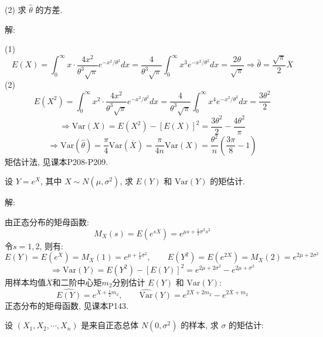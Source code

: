 \documentclass[standard]{ExBook}
\renewenvironment{shaded}{%
  \def\FrameCommand{\fboxsep=\FrameSep \colorbox{shadecolor}}%
  \MakeFramed{\advance\hsize-\width \FrameRestore}%
}{%
  \endMakeFramed
}
\begin{document}
\begin{qitems}
\begin{bbox}
\begin{shaded}
(2) 求 \(\hat{\theta}\) 的方差.
    \end{shaded}
    \end{bbox}

\vspace{\dimexpr2.5cm-5em\relax}

解:

(1)
$$
E(X)=\int_{0}^{\infty}x\cdot\frac{4x^2}{\theta^3\sqrt{\pi}}e^{-x^2/\theta^2}dx
=\frac{4}{\theta^3\sqrt{\pi}}\int_{0}^{\infty}x^3e^{-x^2/\theta^2}dx
=\frac{2\theta}{\sqrt{\pi}}
\Longrightarrow
\hat{\theta}=\frac{\sqrt{\pi}}{2}\overline{X}
$$
(2)
$$
E(X^2)=\int_{0}^{\infty}x^2\cdot\frac{4x^2}{\theta^3\sqrt{\pi}}e^{-x^2/\theta^2}dx
=\frac{4}{\theta^3\sqrt{\pi}}\int_{0}^{\infty}x^4e^{-x^2/\theta^2}dx
=\frac{3\theta^2}{2}
$$
$$
\Longrightarrow
\mathrm{Var}(X)=E(X^2)-[E(X)]^2
=\frac{3\theta^2}{2}-\frac{4\theta^2}{\pi}
$$
$$
\Longrightarrow
\mathrm{Var}(\hat{\theta})
=\frac{\pi}{4}\mathrm{Var}(\overline{X})
=\frac{\pi}{4n}\mathrm{Var}(X)
=\frac{\theta^2}{n}\left(\frac{3\pi}{8}-1\right)
$$
\textcolor{themeColor}{\selectfont {} 矩估计法, 见课本P208-P209.}

\vspace{2.5cm-5em}

    \begin{bbox}
    \begin{shaded}
        \qitem
设 \(Y = e^X\), 其中 \(X \sim N(\mu, \sigma^2)\), 求 \(E(Y)\) 和 \(\text{Var}(Y)\) 的矩估计.
    \end{shaded}
    \end{bbox}

\vspace{\dimexpr2.5cm-5em\relax}

解: 

由正态分布的矩母函数:
$$
M_{X}(s) = E(e^{sX}) = e^{\mu s + \frac{1}{2} \sigma^2 s^2}
$$
令$s = 1, 2$, 则有:
$$
E(Y) = E(e^X) = M_X(1) = e^{\mu + \frac{1}{2} \sigma^2}
,\qquad
E(Y^2) = E(e^{2X}) = M_X(2) = e^{2\mu + 2\sigma^2}
$$
$$
\Longrightarrow
\text{Var}(Y) = E(Y^2) - [E(Y)]^2 = e^{2\mu + 2\sigma^2} - e^{2\mu + \sigma^2}
$$
用样本均值$\overline{X}$和二阶中心矩$m_2$分别估计 \(E(Y)\) 和 \(\text{Var}(Y)\):
$$
\widehat{E(Y)} = e^{\overline{X} + \frac{1}{2} m_2}
,\qquad
\widehat{\text{Var}}(Y) = e^{2\overline{X} + 2m_2} - e^{2\overline{X} + m_2}
$$
\textcolor{themeColor}{\selectfont {} 正态分布的矩母函数, 见课本P143.}

\vspace{2.5cm-5em}

    \begin{bbox}
    \begin{shaded}
        \qitem
设 \((X_1, X_2, \cdots, X_n)\) 是来自正态总体 \(N(0, \sigma^2)\) 的样本, 求 \(\sigma\) 的矩估计:


\end{shaded}
\end{bbox}
\end{qitems}
\end{document}
